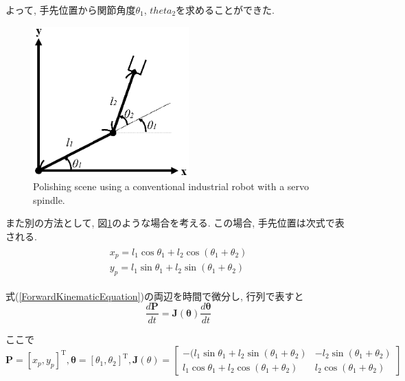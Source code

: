 \documentclass{suribt}
\begin{document}
よって, 手先位置から関節角度$\theta_1$, $theta_2$を求めることができた.

\begin{figure}[ht]
 \begin{center}
  \includegraphics[width=60mm,clip]{./figure/2rink_2.eps}
  \caption{Polishing scene using a conventional industrial robot with a servo spindle.}
  \label{fig:2rink_2}
 \end{center}
\end{figure}

また別の方法として, 図\ref{fig:2rink_2}のような場合を考える. この場合, 手先位置は次式で表される.
\begin{align}
	\begin{aligned}
		\label{ForwardKinematicEquation}
		x_p = l_1 \cos \theta_1 + l_2 \cos(\theta_1 + \theta_2) \\
		y_p = l_1 \sin \theta_1 + l_2 \sin(\theta_1 + \theta_2) 
	\end{aligned}
\end{align}

式(\ref{ForwardKinematicEquation})の両辺を時間で微分し, 行列で表すと
\begin{equation}
	\label{ForwardKinematicEquation_diff}
	\frac{d{\bm P}}{dt} = {\bm J}({\bm \theta})\frac{d{\bm \theta}}{dt}
\end{equation}

ここで
\[
{\bm P} = \left[x_p, y_p \right]^{\mathrm{T}}, {\bm \theta} = \left[\theta_1, \theta_2\right]^{\mathrm{T}}, 
{\bm J}({\theta}) = 
	\left[
		\begin{array}{cc}
			-(l_1 \sin \theta_1 + l_2 \sin(\theta_1 + \theta_2) & -l_2 \sin(\theta_1 + \theta_2) \\
			l_1 \cos \theta_1 + l_2 \cos(\theta_1 + \theta_2) & l_2 \cos(\theta_1 + \theta_2)
		\end{array}
	\right]
\]
\end{document}
